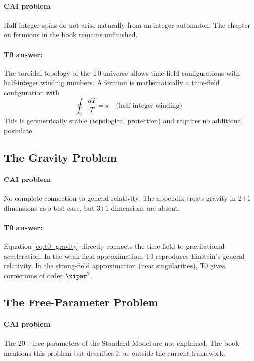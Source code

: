 \paragraph{CAI problem:} Half-integer spins do not arise naturally from an
integer automaton. The chapter on fermions in the book remains unfinished.

\paragraph{T0 answer:} The toroidal topology of the T0 universe allows time-field
configurations with half-integer winding numbers. A fermion is mathematically a
time-field configuration with
\begin{equation}
    \oint_\gamma \frac{d T}{T} = \pi \quad \text{(half-integer winding)}
    \label{eq:fermion_winding}
\end{equation}
This is geometrically stable (topological protection) and requires no additional
postulate.

\subsection{The Gravity Problem}

\paragraph{CAI problem:} No complete connection to general relativity. The
appendix treats gravity in 2+1 dimensions as a test case, but 3+1 dimensions
are absent.

\paragraph{T0 answer:} Equation \eqref{eq:t0_gravity} directly connects the
time field to gravitational acceleration. In the weak-field approximation, T0
reproduces Einstein's general relativity. In the strong-field approximation
(near singularities), T0 gives corrections of order $\xipar^2$.

\subsection{The Free-Parameter Problem}

\paragraph{CAI problem:} The 20+ free parameters of the Standard Model are not
explained. The book mentions this problem but describes it as outside the current
framework.


